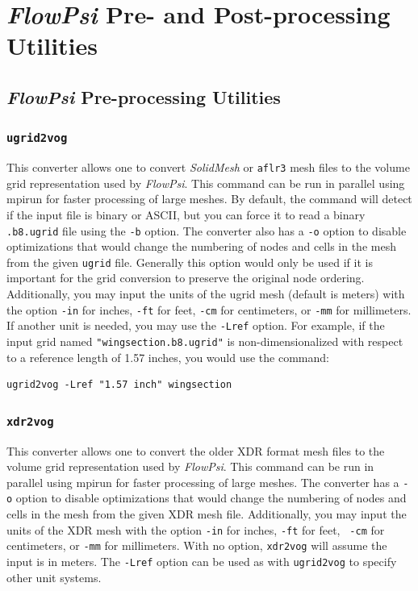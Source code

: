 \documentclass{article}
\begin{document}
\newpage
\section{{\em FlowPsi} Pre- and Post-processing Utilities}

\subsection{{\em FlowPsi} Pre-processing Utilities}

\subsubsection{\tt ugrid2vog}

This converter allows one to convert {\it SolidMesh} or {\tt aflr3}
mesh files to the volume grid representation used by {\em FlowPsi}.  This
command can be run in parallel using mpirun for faster processing of
large meshes.  By default, the command will detect if the input file is
binary or ASCII, but you can force it to read a binary {\tt .b8.ugrid}
file using the {\tt -b} option.  The converter also has a {\tt -o}
option to disable optimizations that would change the numbering of
nodes and cells in the mesh from the given {\tt ugrid} file.
Generally this option would only be used if it is important for the
grid conversion to preserve the original node ordering.  Additionally,
you may input the units of the ugrid mesh (default is meters) with the option {\tt -in}
for inches, {\tt -ft} for feet, {\tt -cm} for centimeters, or {\tt -mm} for millimeters.  If another
unit is needed, you may use the {\tt -Lref} option. For example, if the
input grid named {\tt "wingsection.b8.ugrid"} is
non-dimensionalized with respect to a reference length
of 1.57 inches, you would use the command:
\begin{verbatim}
ugrid2vog -Lref "1.57 inch" wingsection
\end{verbatim}

\subsubsection{\tt xdr2vog}

This converter allows one to convert the older XDR format mesh files
to the volume grid representation used by {\em FlowPsi}.  This command can be
run in parallel using mpirun for faster processing of large meshes.
The converter has a {\tt -o} option to disable optimizations that
would change the numbering of nodes and cells in the mesh from the
given XDR mesh file.  Additionally, you may input the units of the XDR
mesh with the option {\tt -in} for inches, {\tt -ft} for feet, {\tt
  -cm} for centimeters, or {\tt -mm} for millimeters.  With no option,
{\tt xdr2vog} will assume the input is in meters.  The {\tt -Lref}
option can be used as with {\tt ugrid2vog} to specify other unit
systems.  
\end{document}
